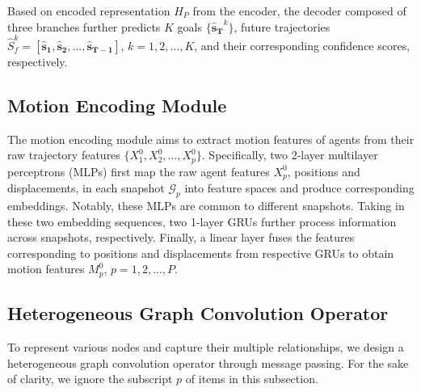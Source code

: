 \documentclass[letterpaper, 10 pt, conference]{ieeeconf}
\begin{document}
Based on encoded representation $H_P$ from the encoder,  the decoder  composed of three branches further predicts $K$ goals $\{\bm{\hat{s}_{T}}^{k}\}$, future trajectories $\hat{S}_f^{k}= \left[ \bm{\hat{s}_{1}}, \bm{\hat{s}_{2}},...,\bm{\hat{s}_{T-1}} \right]$, $k=1,2,\dots, K$, and their corresponding confidence scores, respectively.

\subsection{Motion Encoding Module}
The motion encoding module aims to extract motion features of agents from their raw trajectory features $\{X_1^0, X_2^0, \dots,X_p^0\}$. Specifically, two 2-layer multilayer perceptrons (MLPs) first map the raw agent features $X_p^0$,  positions and displacements, in each snapshot  $\mathcal{G}_p$ into feature spaces and produce corresponding embeddings. Notably, these MLPs are common to different snapshots. Taking in these two embedding sequences, two 1-layer GRUs further process information across snapshots, respectively.  Finally, a linear layer fuses the features corresponding to positions and displacements from respective GRUs to obtain motion features $M_p^0$, $p=1, 2, \dots, P$.

\subsection{Heterogeneous Graph Convolution Operator}
\label{sec.gcn}
To represent various nodes and capture their multiple relationships, we design a heterogeneous graph convolution operator through message passing. For the sake of clarity, we ignore the subscript $p$ of items in this subsection.
\end{document}
